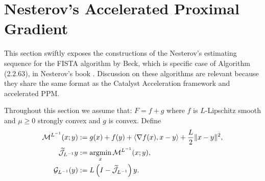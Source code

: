 \documentclass[12pt]{article}
\begin{document}
\section{Nesterov's Accelerated Proximal Gradient}
    This section swiftly exposes the constructions of the Nesterov's estimating sequence for the FISTA algorithm by Beck\cite{beck_fast_2009-1}, which is specific case of Algorithm (2.2.63), in Nesterov's book \cite{nesterov_lectures_2018}. 
    Discussion on these algorithms are relevant because they share the same format as the Catalyst Acceleration framework and accelerated PPM. 
    
    Throughout this section we assume that: $F = f + g$ where $f$ is $L$-Lipschitz smooth and $\mu \ge 0$ strongly convex and $g$ is convex. 
    Define 
    \begin{align*}
        \mathcal M^{L^{-1}}(x; y) 
        &:= g(x) + f(y) 
        + 
        \left\langle \nabla f(x), x - y\right\rangle 
        + 
        \frac{L}{2}\Vert x - y\Vert^2, 
        \\
        \widetilde{\mathcal J}_{L^{-1}}y 
        &:= \mathop{\rm argmin}\limits_{x} \mathcal M^{L^{-1}}(x; y), 
        \\
        \mathcal G_{L^{-1}}(y)
        &:= L\left(I - \widetilde{\mathcal J}_{L^{-1}}\right)y. 
    \end{align*}
\end{document}
